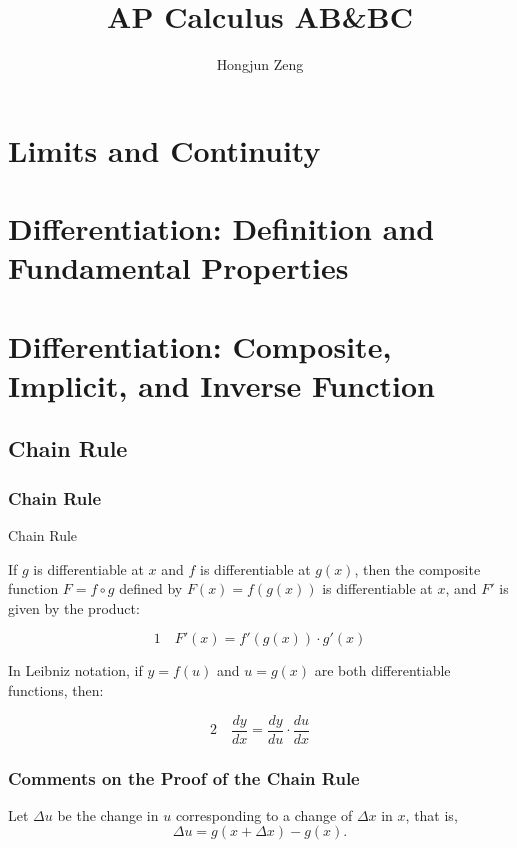 \documentclass[12pt]{article}
\theoremstyle{beautifulthm}
\begin{document}
\title{AP Calculus AB\&BC}
\author{Hongjun Zeng}
\maketitle

\lipsum[1-10] 

\newpage
\tableofcontents

\newpage
\section{Limits and Continuity}
\section{Differentiation: Definition and Fundamental Properties}

\section{Differentiation: Composite, Implicit, and Inverse Function}
\newpage
\subsection{Chain Rule}
\subsubsection{Chain Rule}
\begin{mytheorem}{Chain Rule}{}

If \(g\) is differentiable at \(x\) and \(f\) is differentiable at \(g(x)\), then the composite function \(F = f \circ g\) defined by \(F(x) = f(g(x))\) is differentiable at \(x\), and \(F'\) is given by the product:

\[
\boxed{1} \quad F'(x) = f'(g(x)) \cdot g'(x)
\]

\noindent
In Leibniz notation, if \(y = f(u)\) and \(u = g(x)\) are both differentiable functions, then:

\[
\boxed{2} \quad \frac{dy}{dx} = \frac{dy}{du} \cdot \frac{du}{dx}
\]
\end{mytheorem}
\subsubsection*{Comments on the Proof of the Chain Rule}

Let \(\Delta u\) be the change in \(u\) corresponding to a change of \(\Delta x\) in \(x\), that is,
\[
\Delta u = g(x + \Delta x) - g(x).
\]
\end{document}
